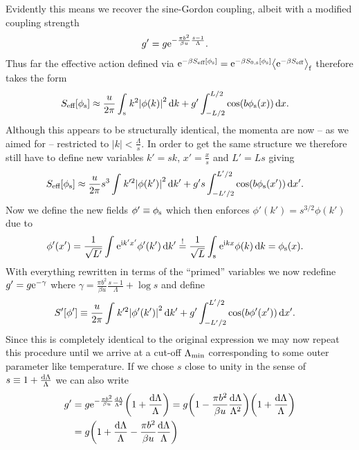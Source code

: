\documentclass[english, parskip=full]{scrartcl}
\begin{document}
Evidently this means we recover the sine-Gordon coupling, albeit with a modified coupling strength
\begin{align}
g' &= g \text{e}^{-\frac{\pi b^2}{\beta u} \frac{s-1}{\Lambda} }.
\end{align}
Thus far the effective action defined via $\powe{-\beta S_\Text{eff}[\phi_\s]} = \powe{-\beta S_{0,\s}[\phi_\s]} \bra*{\powe{-\beta S_\Text{eff}}}_\f$ therefore takes the form
\begin{align}
S_\Text{eff}[\phi_\s] &\approx \frac{u}{2\pi} \intx{\s}{ }{k^2 \abs*{\phi(k)}^2}{k} + g' \intx{-L/2}{L/2}{\cos\kla*{b\phi_\s(x)}}{x}.
\end{align}
Although this appears to be structurally identical, the momenta are now -- as we aimed for -- restricted to $|k|<\frac{\Lambda}{s}$.
In order to get the same structure we therefore still have to define new variables $k'=sk$, $x' = \frac{x}{s}$ and $L'=Ls$ giving
\begin{align}
S_\Text{eff}[\phi_\s] &\approx \frac{u}{2\pi} s^3 \intx{ }{ }{k'^2 \abs*{\phi(k')}^2 }{k'} + g' s \intx{-L'/2}{L'/2}{ \cos\kla*{b \phi_\s(x')} }{x'}.
\end{align}
Now we define the new fields $\phi'\equiv \phi_{\text{s}}$ which then enforces $\phi'(k') = s^{3/2} \phi(k')$ due to
\begin{align}
\phi'(x') &= \frac{1}{\sqrt{L'}} \int_{ }^{ } \text{e}^{\text{i} k'x'}\phi'(k') \,\mathrm{d}k' \overset{!}{=} \frac{1}{\sqrt{L}} \int_{\text{s}}^{ } \text{e}^{\text{i} kx} \phi(k) \,\mathrm{d}k = \phi_{\text{s}}(x).
\end{align}
With everything rewritten in terms of the ``primed'' variables we now redefine $g' = g \text{e}^{-\gamma} $ where $\gamma = \frac{\pi b^2}{\beta u} \frac{s-1}{\Lambda} + \log s$ and define
\begin{align}
S'[\phi'] &\equiv \frac{u}{2\pi} \intx{ }{ }{k'^2 \abs*{\phi'(k')}^2 }{k'} + g' \intx{-L'/2}{L'/2}{ \cos\kla*{b \phi'(x')} }{x'}.
\end{align}
Since this is completely identical to the original expression we may now repeat this procedure until we arrive at a cut-off $\Lambda_{\text{min}}$ corresponding to some outer parameter like temperature.
If we chose $s$ close to unity in the sense of $s\equiv 1 + \frac{\text{d}\Lambda}{\Lambda}$ we can also write
\begin{align}
g' &= g \powe{-\frac{\pi b^2}{\beta u} \frac{\d\Lambda}{\Lambda^2}} \kla*{1 + \frac{\d\Lambda}{\Lambda}} = g \kla*{1 - \frac{\pi b^2}{\beta u} \frac{\d \Lambda}{\Lambda^2}} \kla*{1 + \frac{\d\Lambda}{\Lambda}} \\
&= g \kla*{1 + \frac{\d\Lambda}{\Lambda} - \frac{\pi b^2}{\beta u} \frac{\d\Lambda}{\Lambda}}
\end{align}
\end{document}
